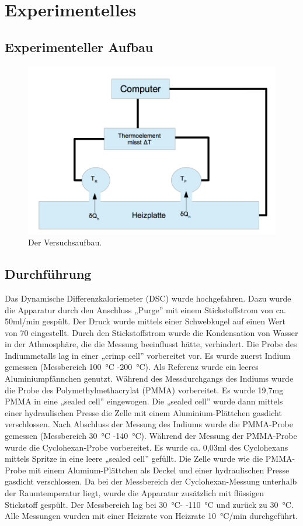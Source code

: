 \documentclass[12pt,a4paper,titlepage,headinclude,bibtotoc]{scrartcl}
\begin{document}
\section{Experimentelles}
\subsection{Experimenteller Aufbau}
\begin{figure}[h]
\centering
\includegraphics[width=13.5cm]{VB_SN.png}
\caption{Der Versuchsaufbau.}
\end{figure} 
\FloatBarrier

\newpage
\subsection{Durchführung}
Das Dynamische Differenzkaloriemeter (DSC) wurde hochgefahren. Dazu wurde die Apparatur durch den Anschluss „Purge” \;mit einem Stickstoffstrom von ca. 50\;ml/min gespült. Der Druck wurde mittels einer Schwebkugel auf einen Wert von 70 eingestellt. Durch den Stickstoffstrom wurde die Kondensation von Wasser in der Athmosphäre, die die Messung beeinflusst hätte, verhindert. Die Probe des Indiummetalls lag in einer „crimp cell” \;vorbereitet vor. Es wurde zuerst Indium gemessen (Messbereich 100~°C -200~°C). Als Referenz wurde ein leeres Aluminiumpfännchen genutzt. Während des Messdurchgangs des Indiums wurde die Probe des Polymethylmethacrylat (PMMA) vorbereitet. Es wurde 19,7\;mg PMMA in eine „sealed cell” \;eingewogen. Die „sealed cell” \;wurde dann mittels einer hydraulischen Presse die Zelle mit einem Aluminium-Plättchen gasdicht verschlossen. Nach Abschluss der Messung des Indiums wurde die PMMA-Probe gemessen (Messbereich 30~°C -140~°C). Während der Messung der PMMA-Probe wurde die Cyclohexan-Probe vorbereitet. Es wurde ca. 0,03\;ml des Cyclohexans mittels Spritze in eine leere „sealed cell” \;gefüllt. Die Zelle wurde wie die PMMA-Probe mit einem Alumium-Plättchen als Deckel und einer hydraulischen Presse gasdicht verschlossen. Da bei der Messbereich der Cyclohexan-Messung unterhalb der Raumtemperatur liegt, wurde die Apparatur zusätzlich mit flüssigen Stickstoff gespült. Der Messbereich lag bei 30~°C- -110~°C und zurück zu 30~°C. Alle Messungen wurden mit einer Heizrate von Heizrate 10~°C/min durchgeführt.\\
\end{document}
